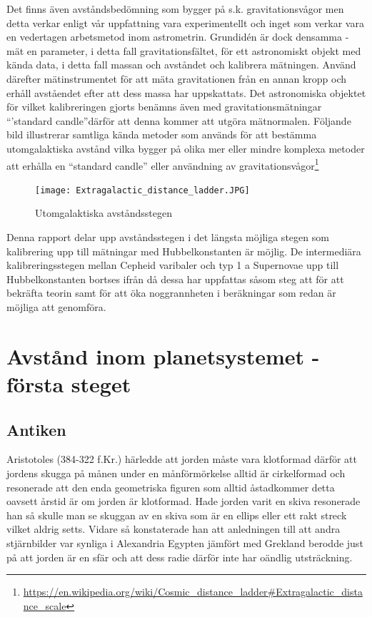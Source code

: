 \documentclass[./exercises.tex]{subfiles}
\begin{document}
Det finns även avståndsbedömning som bygger på s.k. gravitationsvågor men
detta verkar enligt vår uppfattning vara experimentellt och inget som verkar vara en vedertagen arbetsmetod
inom astrometrin. Grundid\'en är dock densamma - mät en parameter, i detta fall gravitationsfältet, för ett astronomiskt
objekt med kända data, i detta fall massan och avståndet och kalibrera mätningen. Använd därefter
mätinstrumentet för att mäta gravitationen från en annan kropp och erhåll avståendet efter att dess massa
har uppskattats. Det astronomiska objektet för vilket kalibreringen gjorts benämns även med gravitationsmätningar ``'standard candle''därför
att denna kommer att utgöra mätnormalen.
Följande bild illustrerar samtliga kända metoder som används för att bestämma utomgalaktiska avstånd vilka
bygger på olika mer eller mindre komplexa metoder att erhålla en ``standard candle'' eller användning av
gravitationsvågor\footnote{\url{https://en.wikipedia.org/wiki/Cosmic_distance_ladder\#Extragalactic_distance_scale}}
\begin{figure}[H]
  \texttt{[image: Extragalactic\_distance\_ladder.JPG]}
  \caption{Utomgalaktiska avståndsstegen}
  \label{fig4}
\end{figure}
Denna rapport delar upp avståndsstegen i det längsta möjliga stegen som kalibrering upp till mätningar med Hubbelkonstanten är möjlig.
De intermediära kalibreringsstegen mellan Cepheid varibaler och typ 1 a Supernovae upp till Hubbelkonstanten
bortses ifrån då dessa har uppfattas såsom steg att för att bekräfta teorin samt för att öka noggrannheten
i beräkningar som redan är möjliga att genomföra.

\section{Avstånd inom planetsystemet -första steget}
\subsection{Antiken}
Aristotoles (384-322 f.Kr.) härledde att jorden måste vara klotformad därför att jordens skugga
 på månen under en månförmörkelse alltid är cirkelformad och resonerade att den enda geometriska figuren som alltid åstadkommer detta oavsett årstid
är om jorden är klotformad. Hade jorden varit en skiva resonerade han så skulle man se skuggan av en skiva som är en ellips eller
ett rakt streck vilket aldrig setts. Vidare så konstaterade han att anledningen till att andra stjärnbilder var
synliga i Alexandria Egypten jämfört med Grekland berodde just på att jorden är en sfär och att dess radie
därför inte har oändlig utsträckning.\\
\end{document}
